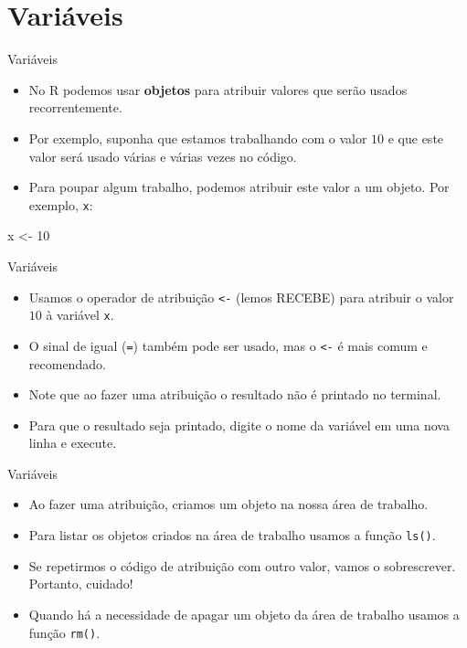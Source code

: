 \documentclass[
  ignorenonframetext,
  serif,
  professionalfont,
  usenames,
  dvipsnames,
  aspectratio = 169]{beamer}
\newenvironment{Shaded}{}{}
\newcommand{\DecValTok}[1]{#1}
\newcommand{\NormalTok}[1]{#1}
\newcommand{\OtherTok}[1]{\textcolor[rgb]{1.00,0.25,0.00}{#1}}
\renewenvironment{Shaded}{
    \vspace{2pt}
    \begin{tcolorbox}[
      boxrule=0pt,      %
      colframe=gray!10, %
      colback=gray!10,  %
      arc=1em,          %
      sharp corners,
      boxsep=0.5em,     %
      left=3pt, right=3pt, top=3pt, bottom=3pt, %
      grow to left by=0mm,
      grow to right by=6pt,
      ]
    }{
    \end{tcolorbox}
    \vspace{-3pt}
    }
\begin{document}
\hypertarget{variuxe1veis}{%
\section{Variáveis}\label{variuxe1veis}}

\begin{frame}[fragile]{Variáveis}
\protect\hypertarget{variuxe1veis-1}{}
\begin{itemize}
\item
  No R podemos usar \textbf{objetos} para atribuir valores que serão
  usados recorrentemente.
\item
  Por exemplo, suponha que estamos trabalhando com o valor \(10\) e que
  este valor será usado várias e várias vezes no código.
\item
  Para poupar algum trabalho, podemos atribuir este valor a um objeto.
  Por exemplo, \texttt{x}:
\end{itemize}

\begin{Shaded}
\begin{Highlighting}[]
\NormalTok{x }\OtherTok{\textless{}{-}} \DecValTok{10}
\end{Highlighting}
\end{Shaded}
\end{frame}

\begin{frame}[fragile]{Variáveis}
\protect\hypertarget{variuxe1veis-2}{}
\begin{itemize}
\item
  Usamos o operador de atribuição \texttt{\textless{}-} (lemos RECEBE)
  para atribuir o valor \(10\) à variável \texttt{x}.
\item
  O sinal de igual (\texttt{=}) também pode ser usado, mas o
  \texttt{\textless{}-} é mais comum e recomendado.
\item
  Note que ao fazer uma atribuição o resultado não é printado no
  terminal.
\item
  Para que o resultado seja printado, digite o nome da variável em uma
  nova linha e execute.
\end{itemize}
\end{frame}

\begin{frame}[fragile]{Variáveis}
\protect\hypertarget{variuxe1veis-3}{}
\begin{itemize}
\item
  Ao fazer uma atribuição, criamos um objeto na nossa área de trabalho.
\item
  Para listar os objetos criados na área de trabalho usamos a função
  \texttt{ls()}.
\item
  Se repetirmos o código de atribuição com outro valor, vamos o
  sobrescrever. Portanto, cuidado!
\item
  Quando há a necessidade de apagar um objeto da área de trabalho usamos
  a função \texttt{rm()}.
\end{itemize}
\end{frame}
\end{document}
